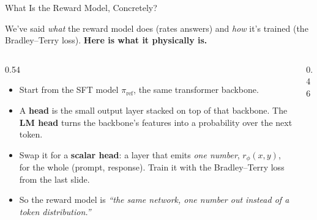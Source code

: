 \begin{frame}{What Is the Reward Model, Concretely?}
\vspace{0.8em}
\begin{center}\small
We've said \emph{what} the reward model does (rates answers) and \emph{how} it's
trained (the Bradley--Terry loss). \textbf{Here is what it physically is.}
\end{center}
\vspace{0.6em}
\begin{columns}[c]
\begin{column}{0.54\textwidth}
\begin{itemize}\itemsep0.35em\small
    \item Start from the SFT model $\pi_{\text{ref}}$, the same transformer
          backbone.
    \item A \textbf{head} is the small output layer stacked on top of that backbone.
          The \textbf{LM head} turns the backbone's features into a probability over
          the next token.
    \item Swap it for a \textbf{scalar head}: a layer that emits \emph{one number},
          $r_\phi(x, y)$, for the whole (prompt, response). Train it with the
          Bradley--Terry loss from the last slide.
    \item So the reward model is \emph{``the same network, one number out instead
          of a token distribution.''}
\end{itemize}
\end{column}
\begin{column}{0.46\textwidth}
\centering
{}
\end{column}
\end{columns}
\end{frame}

